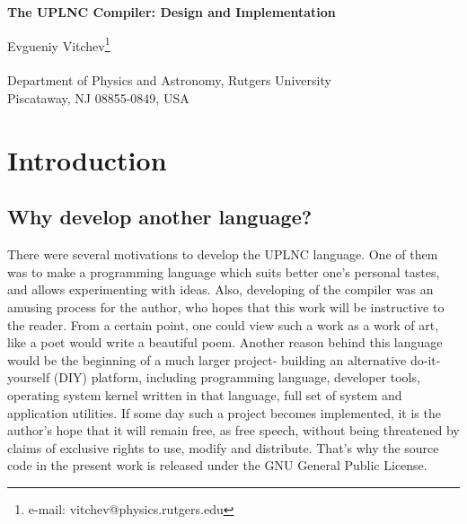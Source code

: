 \documentclass[10pt]{article}
\begin{document}
\vspace*{1cm}

\begin{center}
{\bf{The UPLNC Compiler: Design and Implementation\\
}}

\vspace*{1cm}

Evgueniy Vitchev\footnote{e-mail: vitchev@physics.rutgers.edu}
\ \\

\ \\
Department of Physics and Astronomy, Rutgers University \\
Piscataway, NJ 08855-0849, USA
\end{center}


\vspace*{.8cm}

\begin{abstract}
The implementation of the compiler of the UPLNC language is presented
with a full source code listing.
\end{abstract}

\section{Introduction}
\subsection{Why develop another language?}
There were several motivations to develop the UPLNC language. One of
them was to make a programming language which suits better one's
personal tastes, and allows experimenting with ideas. Also, developing
of the compiler was an amusing process 
for the author, who hopes that this work will be instructive to the
reader. From a certain point, one could view such a work as a work of
art, like a poet would write a beautiful poem.
Another reason behind this language would be the beginning of a much
larger project- building an alternative do-it-yourself (DIY) platform,
including programming language, developer tools, operating system
kernel written in that language, full set of system and application
utilities.
If some day such a project becomes implemented, it is the author's hope
that it will remain free, as free speech, without being threatened by
claims of exclusive rights to use, modify and distribute. That's why the
source code in the present work is released under the GNU General Public
License. 
\end{document}

